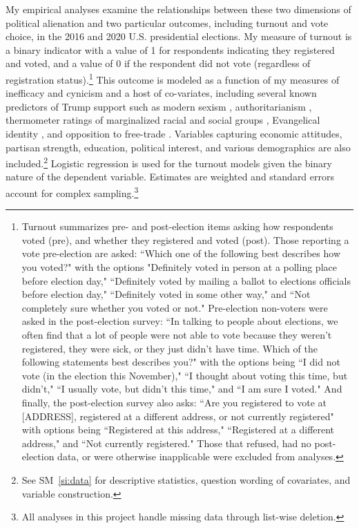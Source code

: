 \documentclass[12pt]{article}
\begin{document}
My empirical analyses examine the relationships between these two dimensions of political alienation and two particular outcomes, including turnout and vote choice, in the 2016 and 2020 U.S. presidential elections. My measure of turnout is a binary indicator with a value of 1 for respondents indicating they registered and voted, and a value of 0 if the respondent did not vote (regardless of registration status).\footnote{Turnout summarizes pre- and post-election items asking how respondents voted (pre), and whether they registered and voted (post). Those reporting a vote pre-election are asked: ``Which one of the following best describes how you voted?" with the options "Definitely voted in person at a polling place before election day," ``Definitely voted by mailing a ballot to elections officials before election day," ``Definitely voted in some other way," and ``Not completely sure whether you voted or not." Pre-election non-voters were asked in the post-election survey: ``In talking to people about elections, we often find that a lot of people were not able to vote because they weren't registered, they were sick, or they just didn't have time. Which of the following statements best describes you?" with the options being ``I did not vote (in the election this November)," ``I thought about voting this time, but didn't," ``I usually vote, but didn't this time," and ``I am sure I voted." And finally, the post-election survey also asks: ``Are you registered to vote at [ADDRESS], registered at a different address, or not currently registered" with options being ``Registered at this address," ``Registered at a different address," and ``Not currently registered." Those that refused, had no post-election data, or were otherwise inapplicable were excluded from analyses.} This outcome is modeled as a function of my measures of inefficacy and cynicism and a host of co-variates, including several known predictors of Trump support such as modern sexism \parencite{valentino2018mobilizing}, authoritarianism \parencite{knuckey2022authoritarianism}, thermometer ratings of marginalized racial and social groups \parencite[i.e., Hipsanics, Muslims, Blacks, and LGBT;][]{mason2021activating}, Evangelical identity \parencite{margolis2020who}, and opposition to free-trade \parencite{mutz2018status}. Variables capturing economic attitudes, partisan strength, education, political interest, and various demographics are also included.\footnote{See SM~\ref{si:data} for descriptive statistics, question wording of covariates, and variable construction.} Logistic regression is used for the turnout models given the binary nature of the dependent variable. Estimates are weighted and standard errors account for complex sampling.\footnote{All analyses in this project handle missing data through list-wise deletion.}
\end{document}
